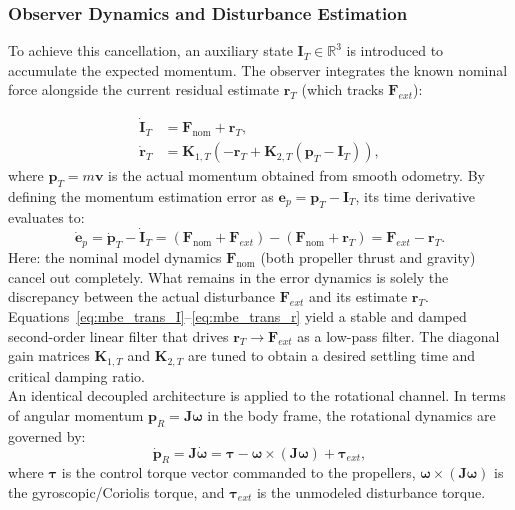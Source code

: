 \subsubsection{Observer Dynamics and Disturbance Estimation}
To achieve this cancellation, an auxiliary state $\mathbf{I}_T \in \mathbb{R}^3$ is introduced to accumulate the expected momentum. The observer integrates the known nominal force alongside the current residual estimate $\mathbf{r}_T$ (which tracks $\mathbf{F}_{ext}$):

\begin{align}
    \dot{\mathbf{I}}_T &= \mathbf{F}_{\text{nom}} + \mathbf{r}_T, \label{eq:mbe_trans_I} \\
    \dot{\mathbf{r}}_T &= \mathbf{K}_{1,T} \left( -\mathbf{r}_T + \mathbf{K}_{2,T} (\mathbf{p}_T - \mathbf{I}_T) \right), \label{eq:mbe_trans_r}
\end{align}
where $\mathbf{p}_T = m \mathbf{v}$ is the actual momentum obtained from smooth odometry.
By defining the momentum estimation error as $\mathbf{e}_p = \mathbf{p}_T - \mathbf{I}_T$, its time derivative evaluates to:
\begin{equation}
    \dot{\mathbf{e}}_p = \dot{\mathbf{p}}_T - \dot{\mathbf{I}}_T = (\mathbf{F}_{\text{nom}} + \mathbf{F}_{ext}) - (\mathbf{F}_{\text{nom}} + \mathbf{r}_T) = \mathbf{F}_{ext} - \mathbf{r}_T.
\end{equation}
Here: the nominal model dynamics $\mathbf{F}_{\text{nom}}$ (both propeller thrust and gravity) cancel out completely. What remains in the error dynamics is solely the discrepancy between the actual disturbance $\mathbf{F}_{ext}$ and its estimate $\mathbf{r}_T$. Equations~\eqref{eq:mbe_trans_I}--\eqref{eq:mbe_trans_r} yield a stable and damped second-order linear filter that drives $\mathbf{r}_T \to \mathbf{F}_{ext}$ as a low-pass filter. The diagonal gain matrices $\mathbf{K}_{1,T}$ and $\mathbf{K}_{2,T}$ are tuned to obtain a desired settling time and critical damping ratio.
\\An identical decoupled architecture is applied to the rotational channel. In terms of angular momentum $\mathbf{p}_R = \mathbf{J} \boldsymbol{\omega}$ in the body frame, the rotational dynamics are governed by:
\begin{equation}
    \dot{\mathbf{p}}_R = \mathbf{J} \dot{\boldsymbol{\omega}} = \boldsymbol{\tau} - \boldsymbol{\omega} \times (\mathbf{J} \boldsymbol{\omega}) + \boldsymbol{\tau}_{ext},
\end{equation}
where $\boldsymbol{\tau}$ is the control torque vector commanded to the propellers, $\boldsymbol{\omega} \times (\mathbf{J} \boldsymbol{\omega})$ is the gyroscopic/Coriolis torque, and $\boldsymbol{\tau}_{ext}$ is the unmodeled disturbance torque. 
